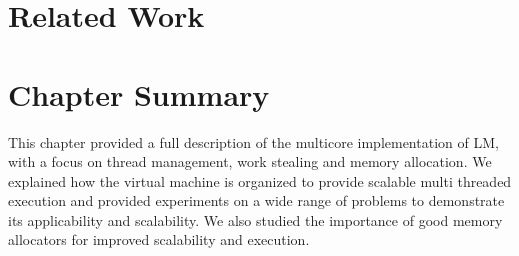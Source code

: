 \section{Related Work}


\section{Chapter Summary}

This chapter provided a full description of the multicore implementation of LM,
with a focus on thread management, work stealing and memory allocation.  We
explained how the virtual machine is organized to provide scalable multi
threaded execution and provided experiments on a wide range of problems to
demonstrate its applicability and scalability. We also studied the importance of
good memory allocators for improved scalability and execution.
